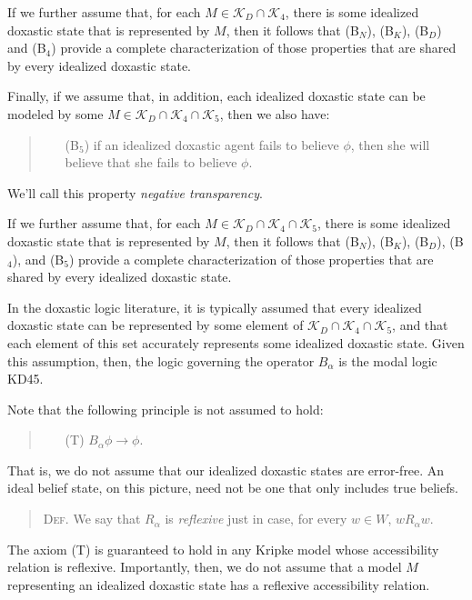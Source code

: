 If we further assume that, for each $M \in \mathcal{K}_D \cap \mathcal{K}_4$, there is some idealized doxastic state that is represented by $M$, then it follows that (B$_N$), (B$_K$), (B$_D$) and (B$_4$) provide a complete characterization of those properties that are shared by every idealized doxastic state. 

Finally, if we assume that, in addition, each idealized doxastic state can be modeled by some $M \in  \mathcal{K}_D \cap \mathcal{K}_4 \cap \mathcal{K}_5$, then we also have:
\begin{quote}
\begin{itemize}
\item[(B$_5$)] if an idealized doxastic agent fails to believe $\phi$, then she will believe that she fails to believe $\phi$.
\end{itemize}
\end{quote}
We'll call this property \textit{negative transparency}.

If we further assume that, for each $M \in \mathcal{K}_D \cap \mathcal{K}_4 \cap \mathcal{K}_5$, there is some idealized doxastic state that is represented by $M$, then it follows that (B$_N$), (B$_K$), (B$_D$), (B$_4$), and (B$_5$) provide a complete characterization of those properties that are shared by every idealized doxastic state. 

In the doxastic logic literature, it is typically assumed that every idealized doxastic state can be represented by some element of $\mathcal{K}_D \cap \mathcal{K}_4 \cap \mathcal{K}_5$, and that each element of this set accurately represents some idealized doxastic state.
Given this assumption, then, the logic governing the operator $B_\alpha$ is the modal logic KD45.

Note that the following principle is not assumed to hold:
\begin{quote}
\begin{itemize}
\item[(T)]\quad $B_\alpha \phi \rightarrow \phi$.
\end{itemize}
\end{quote}
That is, we do not assume that our idealized doxastic states are error-free. 
An ideal belief state, on this picture, need not be one that only includes true beliefs.
\begin{quote}
\textsc{Def.}\; We say that $R_\alpha$ is \textit{reflexive} just in case, for every $w \in W$, $w R_\alpha w$.
\end{quote}
The axiom (T) is guaranteed to hold in any Kripke model whose accessibility relation is reflexive.
Importantly, then, we do not assume that a model $M$ representing an idealized doxastic state has a reflexive accessibility relation.



